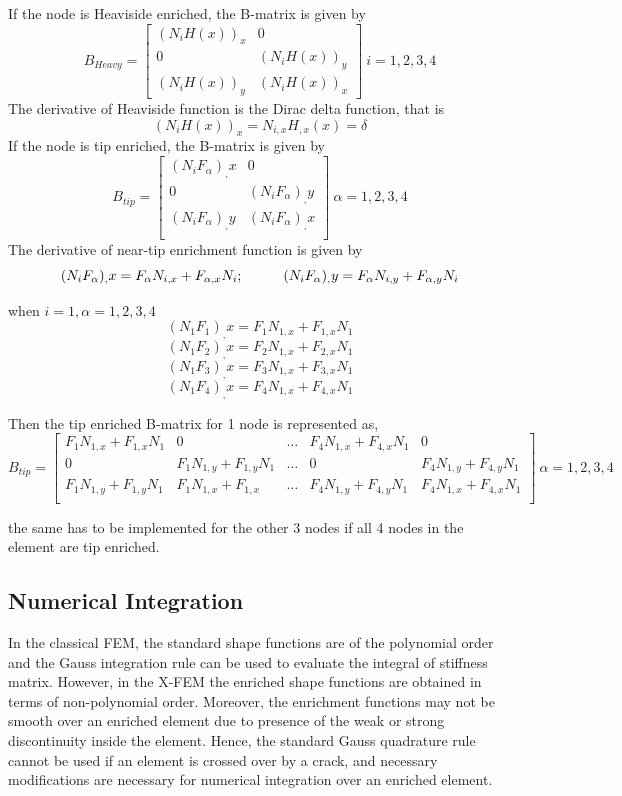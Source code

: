 \documentclass[fleqn, 12.5pt,a4paper]{report}
\newcommand\tab[1][1cm]{\hspace*{#1}}
\begin{document}
If the node is Heaviside enriched, the B-matrix\cite{khoei2014extended} is given by
$$
B_{Heavy} = \begin{bmatrix}
(N_i H(x))_x & 0\\
0 & (N_i H(x))_y\\
(N_i H(x))_y & (N_i H(x))_x
\end{bmatrix}
\: i=1,2,3,4
$$
The derivative of Heaviside function is the Dirac delta function\cite{khoei2014extended}, that is
$$(N_i H(x))_x = N_{i,x} H_{,x}(x) = \delta$$
If the node is tip enriched, the B-matrix \cite{khoei2014extended} is given by
$$
B_{tip} = \begin{bmatrix}
(N_i F_{\alpha})_,x & 0\\
0 & (N_i F_{\alpha})_,y\\
(N_i F_{\alpha})_,y & (N_i F_{\alpha})_,x\\
\end{bmatrix}
\: \alpha = 1,2,3,4
$$
The derivative of near-tip enrichment function\cite{khoei2014extended} is given by
$$(N_i F_{\alpha})_,x = F_{\alpha} N_{i,x} + F_{\alpha,x} N_i ; \tab[1cm] (N_i F_{\alpha})_,y = F_{\alpha} N_{i,y} + F_{\alpha,y} N_i $$

when $i=1, \alpha = 1,2,3,4$
$$(N_1 F_1)_,x = F_1 N_{1,x} + F_{1,x} N_1 $$
$$(N_1 F_2)_,x = F_2 N_{1,x} + F_{2,x} N_1 $$
$$(N_1 F_3)_,x = F_3 N_{1,x} + F_{3,x} N_1 $$
$$(N_1 F_4)_,x = F_4 N_{1,x} + F_{4,x} N_1 $$

Then the tip enriched B-matrix for 1 node is represented as,
$$
B_{tip} = \begin{bmatrix}
F_1 N_{1,x} + F_{1,x} N_1 & 0 & \dots  & F_4 N_{1,x} + F_{4,x} N_1 & 0\\
0 & F_1 N_{1,y} + F_{1,y} N_1 & \dots & 0 & F_4 N_{1,y} + F_{4,y} N_1\\
F_1 N_{1,y} + F_{1,y} N_1 & F_1 N_{1,x} + F_{1,x} & \dots & F_4 N_{1,y} + F_{4,y} N_1 & F_4 N_{1,x} + F_{4,x} N_1\\
\end{bmatrix}
\: \alpha = 1,2,3,4
$$

the same has to be implemented for the other 3 nodes if all 4 nodes in the element are tip enriched.

\subsection{\color{Black} {Numerical Integration}}

In the classical FEM, the standard shape functions are of the polynomial order and the Gauss integration rule can be used to evaluate the integral of stiffness matrix. However, in the X-FEM the enriched shape functions are obtained in terms of non-polynomial order. Moreover, the enrichment functions may not be smooth over an enriched element due to presence of the weak or strong discontinuity inside the element. Hence, the standard Gauss quadrature rule cannot be used if an element is crossed over by a crack, and necessary modifications are necessary for numerical integration over an enriched element\cite{khoei2014extended}. \par
\end{document}
